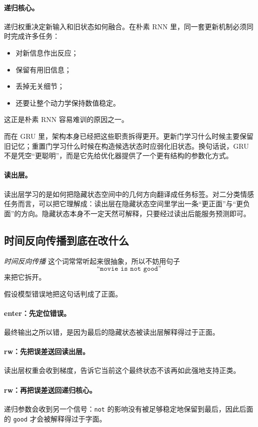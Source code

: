 \documentclass[12pt,a4paper]{ctexart}
\begin{document}
\paragraph{递归核心。}
递归权重决定新输入和旧状态如何融合。在朴素 RNN 里，同一套更新机制必须同时完成许多任务：
\begin{itemize}
  \item 对新信息作出反应；
  \item 保留有用旧信息；
  \item 丢掉无关细节；
  \item 还要让整个动力学保持数值稳定。
\end{itemize}
这正是朴素 RNN 容易难训的原因之一。

而在 GRU 里，架构本身已经把这些职责拆得更开。更新门学习什么时候主要保留旧记忆；重置门学习什么时候在构造候选状态时应弱化旧状态。换句话说，GRU 不是凭空“更聪明”，而是它先给优化器提供了一个更有结构的参数化方式。

\paragraph{读出层。}
读出层学习的是如何把隐藏状态空间中的几何方向翻译成任务标签。对二分类情感任务而言，可以把它理解成：读出层在隐藏状态空间里学出一条“更正面”与“更负面”的方向。隐藏状态本身不一定天然可解释，只要经过读出后能服务预测即可。

\subsection{时间反向传播到底在改什么}

\emph{时间反向传播}
这个词常常听起来很抽象，所以不妨用句子
\[
\texttt{``movie is not good''}
\]
来把它拆开。

假设模型错误地把这句话判成了正面。

\paragraph{enter：先定位错误。}
最终输出之所以错，是因为最后的隐藏状态被读出层解释得过于正面。

\paragraph{rw：先把误差送回读出层。}
读出层权重会收到梯度，告诉它当前这个最终状态不该再如此强地支持正类。

\paragraph{rw：再把误差送回递归核心。}
递归参数会收到另一个信号：\texttt{not} 的影响没有被足够稳定地保留到最后，因此后面的 \texttt{good} 才会被解释得过于字面。
\end{document}
